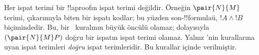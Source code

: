 \documentclass[../../../include/open-logic-section]{subfiles}
\begin{document}
Her ispat terimi bir !!a{proof}{}ın ispat terimi değildir. Örneğin
$\pair{N}{M}$ terimi, \Intro{\land} çıkarımıyla biten bir ispatı kodlar;
bu yüzden son-!!{formula}{}ü, $!A \land !B$ biçimindedir. Bu,
bir~\Elim{\lif} kuralının büyük öncülü olamaz; dolayısıyla
$(\pair{N}{M}P)$ doğru bir ispatın ispat terimi olamaz. Yalnız
'nin kurallarına uyan ispat terimleri \emph{doğru} ispat
terimleridir. Bu kurallar  içinde verilmiştir.


\end{document}
